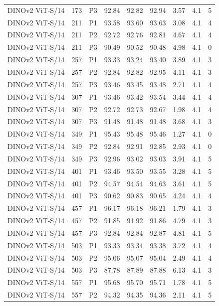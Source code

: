 {\begin{longtable}{lrlrrrrrr}
DINOv2 ViT-S/14 & 173 & P3 & 92.84 & 92.82 & 92.94 & 3.57 & 4.1 & 5 \\
DINOv2 ViT-S/14 & 211 & P1 & 93.58 & 93.60 & 93.63 & 3.08 & 4.1 & 4 \\
DINOv2 ViT-S/14 & 211 & P2 & 92.72 & 92.76 & 92.81 & 4.67 & 4.1 & 4 \\
DINOv2 ViT-S/14 & 211 & P3 & 90.49 & 90.52 & 90.48 & 4.98 & 4.1 & 0 \\
DINOv2 ViT-S/14 & 257 & P1 & 93.33 & 93.24 & 93.40 & 3.89 & 4.1 & 3 \\
DINOv2 ViT-S/14 & 257 & P2 & 92.84 & 92.82 & 92.95 & 4.11 & 4.1 & 3 \\
DINOv2 ViT-S/14 & 257 & P3 & 93.46 & 93.45 & 93.48 & 2.71 & 4.1 & 4 \\
DINOv2 ViT-S/14 & 307 & P1 & 93.46 & 93.42 & 93.54 & 3.44 & 4.1 & 4 \\
DINOv2 ViT-S/14 & 307 & P2 & 92.72 & 92.73 & 92.67 & 1.98 & 4.1 & 4 \\
DINOv2 ViT-S/14 & 307 & P3 & 91.48 & 91.48 & 91.48 & 3.68 & 4.1 & 3 \\
DINOv2 ViT-S/14 & 349 & P1 & 95.43 & 95.48 & 95.46 & 1.27 & 4.1 & 0 \\
DINOv2 ViT-S/14 & 349 & P2 & 92.84 & 92.91 & 92.85 & 2.93 & 4.1 & 0 \\
DINOv2 ViT-S/14 & 349 & P3 & 92.96 & 93.02 & 93.03 & 3.91 & 4.1 & 5 \\
DINOv2 ViT-S/14 & 401 & P1 & 93.46 & 93.50 & 93.55 & 3.28 & 4.1 & 5 \\
DINOv2 ViT-S/14 & 401 & P2 & 94.57 & 94.54 & 94.63 & 3.61 & 4.1 & 5 \\
DINOv2 ViT-S/14 & 401 & P3 & 90.62 & 90.83 & 90.65 & 4.24 & 4.1 & 4 \\
DINOv2 ViT-S/14 & 457 & P1 & 96.17 & 96.18 & 96.21 & 1.79 & 4.1 & 3 \\
DINOv2 ViT-S/14 & 457 & P2 & 91.85 & 91.92 & 91.86 & 4.79 & 4.1 & 3 \\
DINOv2 ViT-S/14 & 457 & P3 & 92.84 & 92.84 & 92.87 & 4.81 & 4.1 & 5 \\
DINOv2 ViT-S/14 & 503 & P1 & 93.33 & 93.34 & 93.38 & 3.72 & 4.1 & 4 \\
DINOv2 ViT-S/14 & 503 & P2 & 95.06 & 95.07 & 95.04 & 2.49 & 4.1 & 4 \\
DINOv2 ViT-S/14 & 503 & P3 & 87.78 & 87.89 & 87.88 & 6.13 & 4.1 & 3 \\
DINOv2 ViT-S/14 & 557 & P1 & 95.68 & 95.70 & 95.71 & 1.78 & 4.1 & 5 \\
DINOv2 ViT-S/14 & 557 & P2 & 94.32 & 94.35 & 94.36 & 2.11 & 4.1 & 5 \\

\end{longtable}}
